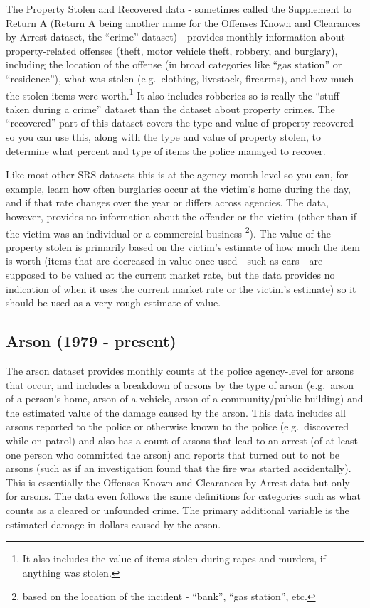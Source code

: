 \documentclass[
  12pt,
  openany]{book}
\begin{document}
The Property Stolen and Recovered data - sometimes called the Supplement to Return A (Return A being another name for the Offenses Known and Clearances by Arrest dataset, the ``crime'' dataset) - provides monthly information about property-related offenses (theft, motor vehicle theft, robbery, and burglary), including the location of the offense (in broad categories like ``gas station'' or ``residence''), what was stolen (e.g.~clothing, livestock, firearms), and how much the stolen items were worth.\footnote{It also includes the value of items stolen during rapes and murders, if anything was stolen.} It also includes robberies so is really the ``stuff taken during a crime'' dataset than the dataset about property crimes. The ``recovered'' part of this dataset covers the type and value of property recovered so you can use this, along with the type and value of property stolen, to determine what percent and type of items the police managed to recover.

Like most other SRS datasets this is at the agency-month level so you can, for example, learn how often burglaries occur at the victim's home during the day, and if that rate changes over the year or differs across agencies. The data, however, provides no information about the offender or the victim (other than if the victim was an individual or a commercial business \footnote{based on the location of the incident - ``bank'', ``gas station'', etc.}). The value of the property stolen is primarily based on the victim's estimate of how much the item is worth (items that are decreased in value once used - such as cars - are supposed to be valued at the current market rate, but the data provides no indication of when it uses the current market rate or the victim's estimate) so it should be used as a very rough estimate of value.

\subsection{Arson (1979 - present)}\label{arson-1979---present}

The arson dataset provides monthly counts at the police agency-level for arsons that occur, and includes a breakdown of arsons by the type of arson (e.g.~arson of a person's home, arson of a vehicle, arson of a community/public building) and the estimated value of the damage caused by the arson. This data includes all arsons reported to the police or otherwise known to the police (e.g.~discovered while on patrol) and also has a count of arsons that lead to an arrest (of at least one person who committed the arson) and reports that turned out to not be arsons (such as if an investigation found that the fire was started accidentally). This is essentially the Offenses Known and Clearances by Arrest data but only for arsons. The data even follows the same definitions for categories such as what counts as a cleared or unfounded crime. The primary additional variable is the estimated damage in dollars caused by the arson.
\end{document}
